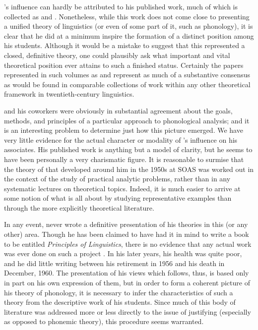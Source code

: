 {\Firth}'s influence can hardly be attributed to his published work, much
of which is collected as \citet{firth57:papers} and
\citet{palmer68:firth.papers}. Nonetheless, while this work does not
come close to presenting a unified theory of linguistics (or even of
some part of it, such as phonology), it is clear that he did at a
minimum inspire the formation of a distinct position among his
students. Although it would be a mistake to suggest that this
represented a closed, definitive theory, one could plausibly ask what
important and vital theoretical position ever attains to such a
finished status. Certainly the papers represented in such volumes as
\citet{studies.in.linguistic.analysis} and \citet{palmer70:prosodic}
represent as much of a substantive consensus as would be found in
comparable collections of work within any other theoretical framework
in twentieth-century linguistics.

{\Firth} and his coworkers were obviously in substantial agreement about
the goals, methods, and principles of a particular approach to
phonological analysis; and it is an interesting problem to determine
just how this picture emerged. We have very little evidence for the
actual character or modality of {\Firth}'s influence on his
associates. His published work is anything but a model of clarity, but
he seems to have been personally a very charismatic figure. It is
reasonable to surmise that the theory of  that
developed around him in the 1950s at SOAS was worked out in the
context of the study of practical analytic problems, rather than in
any systematic lectures on theoretical topics. Indeed, it is much
easier to arrive at some notion of what  is all about
by studying representative examples than through the more explicitly
theoretical literature.

In any event, {\Firth} never wrote a definitive presentation of his
theories in this (or any other) area. Though he has been claimed to
have had it in mind to write a book to be entitled \textsl{Principles
  of Linguistics}, there is no evidence that any actual work was ever
done on such a project \citep{plug08:firth.bio}. In his later years,
his health was quite poor, and he did little writing between his
retirement in 1956 and his death in December, 1960. The presentation of his
views which follows, thus, is based only in part on his own expression
of them, but in order to form a coherent picture of his theory of
phonology, it is necessary to infer the characteristics of such a
theory from the descriptive work of his students. Since much of this
body of literature was addressed more or less directly to the issue of
justifying  (especially as opposed to phonemic
theory), this procedure seems warranted.

